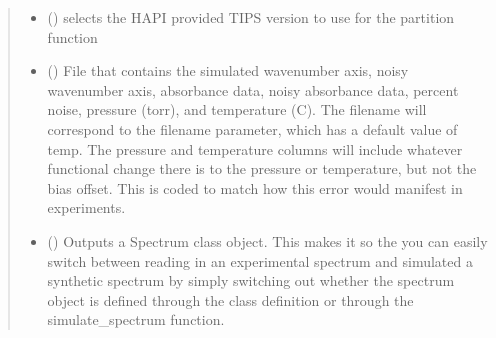 \documentclass[letterpaper,10pt,english]{sphinxmanual}
\begin{document}
\begin{fulllineitems}
\begin{quote}
\begin{description}
\begin{itemize}
\item {} 
\sphinxAtStartPar
{} (\sphinxstyleliteralemphasis{\sphinxupquote{, }}) \textendash{} selects the HAPI provided TIPS version to use for the partition function

\end{itemize}

\sphinxAtStartPar
\begin{itemize}
\item {} 
\sphinxAtStartPar
{} () \textendash{} File that contains the simulated wavenumber axis, noisy wavenumber axis, absorbance data, noisy absorbance data, percent noise, pressure (torr), and temperature (C). The filename will correspond to the filename parameter, which has a default value of temp. The pressure and temperature columns will include whatever functional change there is to the pressure or temperature, but not the bias offset. This is coded to match how this error would manifest in experiments.

\item {} 
\sphinxAtStartPar
{} () \textendash{} Outputs a Spectrum class object. This makes it so the you can easily switch between reading in an experimental spectrum and simulated a synthetic spectrum by simply switching out whether the spectrum object is defined through the class definition or through the simulate\_spectrum function.

\end{itemize}


\end{description}\end{quote}

\end{fulllineitems}

\label{\detokenize{MATS:module-MATS.utilities}}
\end{document}
